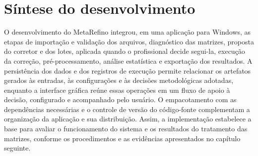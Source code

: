 
\section{Síntese do desenvolvimento}

O desenvolvimento do MetaRefino integrou, em uma aplicação para Windows, as etapas de importação e validação dos arquivos, diagnóstico das matrizes, proposta do corretor e dos lotes, aplicada quando o profissional decide segui-la, execução da correção, pré-processamento, análise estatística e exportação dos resultados. A persistência dos dados e dos registros de execução permite relacionar os artefatos gerados às entradas, às configurações e às decisões metodológicas adotadas, enquanto a interface gráfica reúne essas operações em um fluxo de apoio à decisão, configurado e acompanhado pelo usuário. O empacotamento com as dependências necessárias e o controle de versão do código-fonte complementam a organização da aplicação e sua distribuição. Assim, a implementação estabelece a base para avaliar o funcionamento do sistema e os resultados do tratamento das matrizes, conforme os procedimentos e as evidências apresentados no capítulo seguinte.
